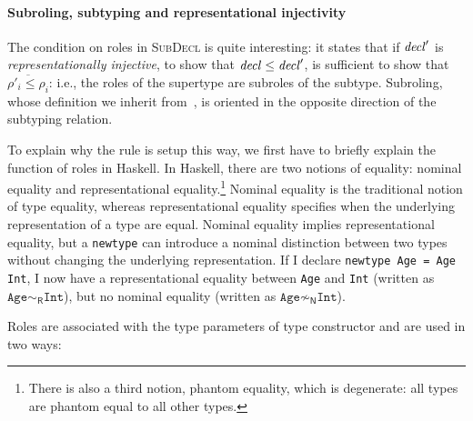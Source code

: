 

\paragraph{Subroling, subtyping and representational injectivity}
The condition on roles in \textsc{SubDecl} is quite interesting:
it states that if $\mathit{decl}'$ is \emph{representationally injective},
to show that $\mathit{decl} \le \mathit{decl}'$,
is sufficient to show that $\overline{\rho'_i \le \rho_i}$: i.e.,
the roles of the supertype are subroles of the subtype.
Subroling, whose definition we inherit from~\cite{Breitner:2014:SZC:2692915.2628141},
is oriented in the opposite direction of the subtyping relation.

To explain why the rule is setup this way, we first have to briefly
explain
the function of roles in Haskell.  In Haskell, there are two notions of
equality: nominal equality and representational equality.\footnote{There is also
a third notion, phantom equality, which is degenerate: all types are phantom
equal to all other types.}  Nominal
equality is the traditional notion of type equality, whereas
representational equality specifies when the underlying representation
of a type are equal.  Nominal equality implies representational
equality, but a \verb|newtype| can introduce a nominal distinction between
two types without changing the underlying representation. If I declare
\verb|newtype Age = Age Int|, I now have a representational equality
between \verb|Age| and \verb|Int| (written as $\texttt{Age}
\sim_\textsf{R} \texttt{Int}$), but no nominal equality (written as $\texttt{Age}
\not\sim_\textsf{N} \texttt{Int}$).

Roles are associated with the type parameters of type constructor and
are used in two ways:

